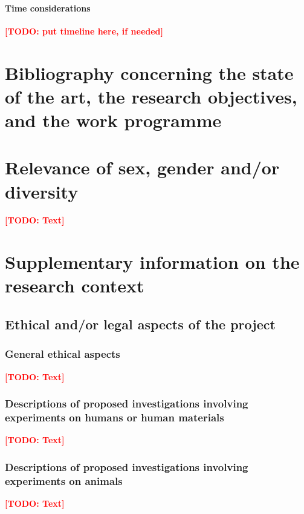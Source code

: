 \documentclass{scrartcl}
\newcommand{\todo}[1]{\xspace{\textcolor{red}{\bfseries[TODO: #1]}}\xspace}
\begin{document}
\paragraph*{Time considerations}
\todo{put timeline here, if needed}


\section{Bibliography concerning the state of the art, the research objectives, and the work programme}
\label{sec:bib}
\printbibliography[notcategory=reviewed, notcategory=nonreviewed, notcategory=patents_pending, notcategory=patents, heading=none]

\section{Relevance of sex, gender and/or diversity}
\todo{Text}


\clearpage
\section{Supplementary information on the research context}

\subsection{Ethical and/or legal aspects of the project}

\subsubsection{General ethical aspects}
\todo{Text}

\subsubsection{Descriptions of proposed investigations involving experiments on humans or human materials}
\todo{Text}

\subsubsection{Descriptions of proposed investigations involving experiments on animals}
\todo{Text}
\end{document}
